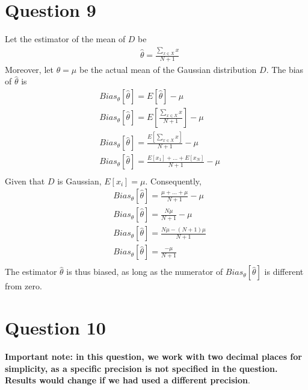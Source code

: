 \documentclass[leqno]{article}
\begin{document}
\section*{Question 9} Let the estimator of the mean of $D$ be
\begin{equation*}
\begin{split}
&\hat{\theta} = \frac{\sum_{x \in X}x}{N + 1}
\end{split}
\end{equation*} 
Moreover, let $\theta = \mu$ be the actual mean of the Gaussian distribution $D$. The bias of $\hat{\theta}$ is 
\begin{equation*}
\begin{split}
&Bias_{\theta}[\hat{\theta}] =  E[\hat{\theta}] - \mu\\
&Bias_{\theta}[\hat{\theta}] =  E[\frac{\sum_{x \in X}x}{N + 1}] - \mu\\
&Bias_{\theta}[\hat{\theta}] = \frac{E[\sum_{x \in X}x]}{N + 1} - \mu\\
&Bias_{\theta}[\hat{\theta}] = \frac{E[x_1] + \ldots + E[x_N]}{N + 1} - \mu\\
\end{split}
\end{equation*}  
Given that $D$ is Gaussian, $E[x_i] = \mu$. Consequently,
\begin{equation*}
\begin{split}
&Bias_{\theta}[\hat{\theta}] = \frac{\mu + \ldots + \mu}{N + 1} - \mu\\
&Bias_{\theta}[\hat{\theta}] = \frac{N\mu}{N + 1} - \mu\\
&Bias_{\theta}[\hat{\theta}] = \frac{N\mu - (N + 1)\mu}{N + 1}\\
&Bias_{\theta}[\hat{\theta}] = \frac{-\mu}{N + 1}\\
\end{split}
\end{equation*}  
The estimator $\hat{\theta}$ is thus biased, as long as the numerator of $Bias_{\theta}[\hat{\theta}]$ is different from zero.

\hfill

\section*{Question 10}  \textbf{Important note: in this question, we work with two decimal places for simplicity, as a specific precision is not specified in the question. 
Results would change if we had used a different precision}. 
\end{document}
